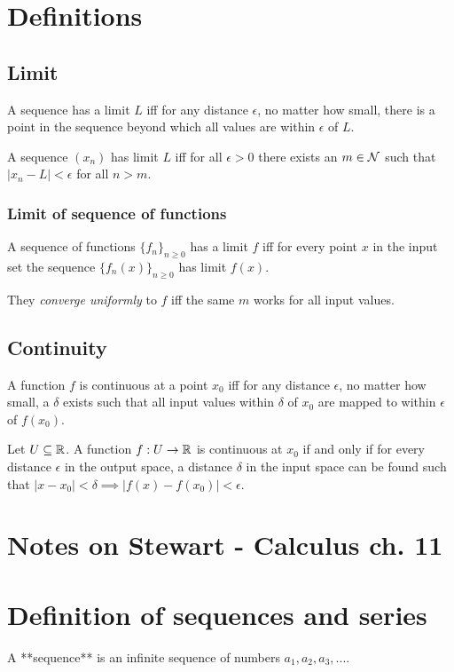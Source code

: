 \section{Definitions}
\subsection{Limit}
A sequence has a limit $L$ iff for any distance $\epsilon$, no matter how
small, there is a point in the sequence beyond which all values are within
$\epsilon$ of $L$.

A sequence $(x_n)$ has limit $L$ iff for all $\epsilon > 0$ there exists an
$m \in \mathcal{N}$ such that $|x_n - L| < \epsilon$ for all $n > m$.

\subsubsection{Limit of sequence of functions}
A sequence of functions $\{f_n\}_{n\geq 0}$ has a limit $f$ iff for every point
$x$ in the input set the sequence $\{f_n(x)\}_{n\geq 0}$ has limit $f(x)$.

They \textit{converge uniformly} to $f$ iff the same $m$ works for all input
values.

\subsection{Continuity}
A function $f$ is continuous at a point $x_0$ iff for any distance $\epsilon$,
no matter how small, a $\delta$ exists such that all input values within
$\delta$ of $x_0$ are mapped to within $\epsilon$ of $f(x_0)$.

Let $U \subseteq \mathbb{R}$. A function $f:U \to \mathbb{R}$ is continuous at $x_0$ if and
only if for every distance $\epsilon$ in the output space, a distance $\delta$
in the input space can be found such that
$|x - x_0| < \delta \implies |f(x) - f(x_0)| < \epsilon$.

\section{Notes on Stewart - Calculus ch. 11}

\section{Definition of sequences and series}

A **sequence** is an infinite sequence of numbers $a_1, a_2, a_3, ...$.

